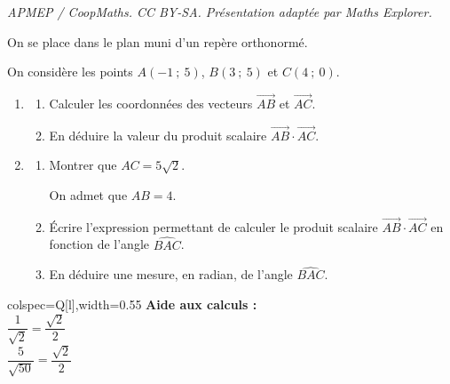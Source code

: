 \documentclass[10pt]{article}
\begin{document}
\noindent\textit{APMEP / CoopMaths. CC BY-SA. Présentation adaptée par Maths Explorer.}\par\medskip
On se place dans le plan muni d'un repère orthonormé.

On considère les points $A(-1\ ;\ 5)$, $B(3\ ;\ 5)$ et $C(4\ ;\ 0)$.

\begin{enumerate}
\item \begin{enumerate}
\item Calculer les coordonnées des vecteurs $\overrightarrow{AB}$ et $\overrightarrow{AC}$.
\item En déduire la valeur du produit scalaire $\overrightarrow{AB}\cdot\overrightarrow{AC}$.
\end{enumerate}
\item \begin{enumerate}
\item Montrer que $AC=5\sqrt{2}$.

On admet que $AB=4$.
\item Écrire l'expression permettant de calculer le produit scalaire $\overrightarrow{AB}\cdot\overrightarrow{AC}$ en fonction de l'angle $\widehat{BAC}$.
\item En déduire une mesure, en radian, de l'angle $\widehat{BAC}$.
\end{enumerate}
\end{enumerate}

\vfill
\begin{center}
\begin{tblr}{colspec={Q[l]},width=0.55\linewidth}
\textbf{Aide aux calculs :} \\
$\dfrac{1}{\sqrt{2}}=\dfrac{\sqrt{2}}{2}$ \\
$\dfrac{5}{\sqrt{50}}=\dfrac{\sqrt{2}}{2}$ \\
\end{tblr}
\end{center}

\clearpage
\end{document}
